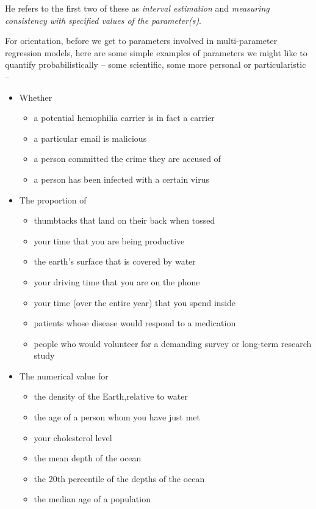 \documentclass[]{book}
\providecommand{\tightlist}{%
  \setlength{\itemsep}{0pt}\setlength{\parskip}{0pt}}
\begin{document}
He refers to the first two of these as \emph{interval estimation} and \emph{measuring consistency with specified values of the parameter(s)}.

For orientation, before we get to parameters involved in multi-parameter regression models, here are some simple examples of parameters we might like to quantify probabilistically -- some scientific, some more personal or particularistic --

\begin{itemize}
\tightlist
\item
  Whether

  \begin{itemize}
  \tightlist
  \item
    a potential hemophilia carrier is in fact a carrier
  \item
    a particular email is malicious
  \item
    a person committed the crime they are accused of
  \item
    a person has been infected with a certain virus
  \end{itemize}
\item
  The proportion of

  \begin{itemize}
  \tightlist
  \item
    thumbtacks that land on their back when tossed
  \item
    your time that you are being productive
  \item
    the earth's surface that is covered by water
  \item
    your driving time that you are on the phone
  \item
    your time (over the entire year) that you spend inside
  \item
    patients whose disease would respond to a medication
  \item
    people who would volunteer for a demanding survey or long-term research study
  \end{itemize}
\item
  The numerical value for

  \begin{itemize}
  \tightlist
  \item
    the density of the Earth,relative to water
  \item
    the age of a person whom you have just met
  \item
    your cholesterol level
  \item
    the mean depth of the ocean
  \item
    the 20th percentile of the depths of the ocean
  \item
    the median age of a population
  \end{itemize}
\end{itemize}
\end{document}
